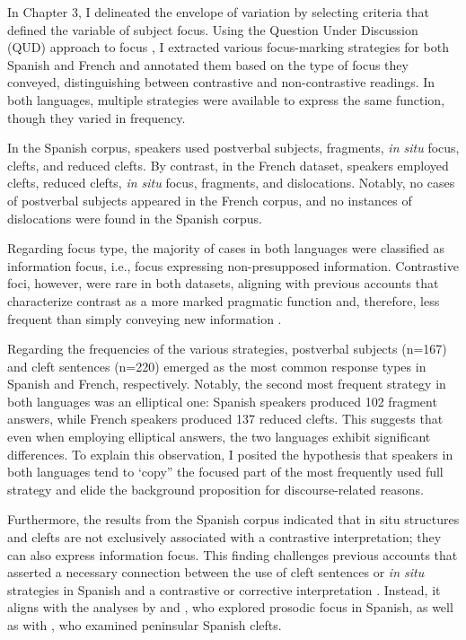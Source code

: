 In Chapter 3, I delineated the envelope of variation by selecting criteria that defined the variable of subject focus. Using the Question Under Discussion (QUD) approach to focus \parencite{roberts1996information, buring2003d, beaver2009sense}, I extracted various focus-marking strategies for both Spanish and French and annotated them based on the type of focus they conveyed, distinguishing between contrastive and non-contrastive readings. In both languages, multiple strategies were available to express the same function, though they varied in frequency.

In the Spanish corpus, speakers used postverbal subjects, fragments, \textit{in situ} focus, clefts, and reduced clefts. By contrast, in the French dataset, speakers employed clefts, reduced clefts, \textit{in situ} focus, fragments, and dislocations. Notably, no cases of postverbal subjects appeared in the French corpus, and no instances of dislocations were found in the Spanish corpus.

Regarding focus type, the majority of cases in both languages were classified as information focus, i.e., focus expressing non-presupposed information. Contrastive foci, however, were rare in both datasets, aligning with previous accounts that characterize contrast as a more marked pragmatic function and, therefore, less frequent than simply conveying new information \parencite{zimmermann2011focus}.

Regarding the frequencies of the various strategies, postverbal subjects (n=167) and cleft sentences (n=220) emerged as the most common response types in Spanish and French, respectively. Notably, the second most frequent strategy in both languages was an elliptical one: Spanish speakers produced 102 fragment answers, while French speakers produced 137 reduced clefts. This suggests that even when employing elliptical answers, the two languages exhibit significant differences.
To explain this observation, I posited the hypothesis that speakers in both languages tend to `copy” the focused part of the most frequently used full strategy and elide the background proposition for discourse-related reasons.

Furthermore, the results from the Spanish corpus indicated that in situ structures and clefts are not exclusively associated with a contrastive interpretation; they can also express information focus. This finding challenges previous accounts that asserted a necessary connection between the use of cleft sentences or \textit{in situ} strategies in Spanish and a contrastive or corrective interpretation \parencite{lambrecht1996information, zubizarreta1998prosody}. Instead, it aligns with the analyses by \textcite{fery2001focus} and \textcite{gabriel2007fokus}, who explored prosodic focus in Spanish, as well as with \textcite{feldhausen2015oraciones}, who examined peninsular Spanish clefts.

